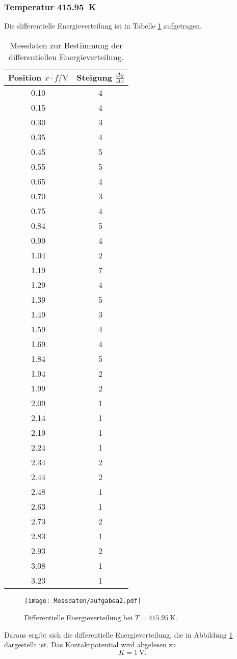 \subsubsection{Temperatur \SI{415,95}{\kelvin}}
Die differentielle Energieverteilung ist in Tabelle \ref{tab:steigisdreieckslol} aufgetragen.
\begin{table}
	\centering
	\caption{Messdaten zur Bestimmung der differentiellen Energieverteilung.}
	\label{tab:steigisdreieckslol}
	\begin{tabular}{cc}
		\toprule
		Position $x \cdot f/\si{\volt}$ & Steigung $\frac{\Delta y}{\Delta x}$ \\
		\midrule
0.10 & 4 \\
0.15 & 4 \\
0.30 & 3 \\
0.35 & 4 \\
0.45 & 5 \\
0.55 & 5 \\
0.65 & 4 \\
0.70 & 3 \\
0.75 & 4 \\
0.84 & 5 \\
0.99 & 4 \\
1.04 & 2 \\
1.19 & 7 \\
1.29 & 4 \\
1.39 & 5 \\
1.49 & 3 \\
1.59 & 4 \\
1.69 & 4 \\
1.84 & 5 \\
1.94 & 2 \\
1.99 & 2 \\
2.09 & 1 \\
2.14 & 1 \\
2.19 & 1 \\
2.24 & 1 \\
2.34 & 2 \\
2.44 & 2 \\
2.48 & 1 \\
2.63 & 1 \\
2.73 & 2 \\
2.83 & 1 \\
2.93 & 2 \\
3.08 & 1 \\
3.23 & 1 \\
		\bottomrule
	\end{tabular}
\end{table}
\begin{figure}
	\centering
	\texttt{[image: Messdaten/aufgabea2.pdf]}
	\caption{Differentielle Energieverteilung bei $T=\SI{415,95}{\kelvin}$.}
	\label{fig:aufgabeA2}
\end{figure}
Daraus ergibt sich die differentielle Energieverteilung, die in Abbildung \ref{fig:aufgabeA2}
dargestellt ist. 
Das Kontaktpotential wird abgelesen zu 
\begin{equation*}
	K = \SI{1}{\volt} \mathrm{.}
\end{equation*}
\FloatBarrier
